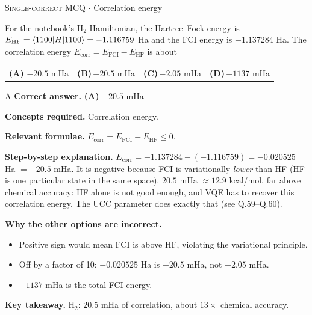 \documentclass[11pt,a4paper]{article}
\newcommand{\optlabel}[1]{\textbf{(#1)}}
\newcommand{\correctlabel}[1]{\textcolor{okgreen}{\textbf{(#1)}\,\ding{51}}}
\newenvironment{qitem}[1]{\begin{list}{}{\setlength{\leftmargin}{3.3em}\setlength{\labelwidth}{3.1em}%
  \setlength{\labelsep}{0.2em}\setlength{\topsep}{3pt}\setlength{\parsep}{3pt}}\item[\textbf{Q.#1}\hfill]}{\end{list}}
\newcommand{\qsep}{\par\vspace{2pt}{\color{black!15}\hrule}\vspace{4pt}}
\newcommand{\qmeta}[2]{{\footnotesize\color{black!60}\textsc{#1} \;$\cdot$\; #2}\par}
\begin{document}
\begin{qitem}{19}
\qmeta{Single-correct MCQ}{Correlation energy}
For the notebook's H$_2$ Hamiltonian, the Hartree--Fock energy is $E_{\mathrm{HF}} = \braket{1100|H|1100} = -1.116759$ Ha and the FCI energy is
$-1.137284$ Ha. The correlation energy $E_{\mathrm{corr}} = E_{\mathrm{FCI}} - E_{\mathrm{HF}}$ is about
\par\smallskip\noindent\begin{tabularx}{\linewidth}{@{}*{4}{L}@{}}
\correctlabel{A}\,$-20.5$ mHa & \optlabel{B}\,$+20.5$ mHa & \optlabel{C}\,$-2.05$ mHa & \optlabel{D}\,$-1137$ mHa
\end{tabularx}
\end{qitem}
\begin{solbox}{A}
\textbf{\color{brand}Correct answer.} \textcolor{okgreen}{\textbf{(A)}} $-20.5$ mHa

\textbf{\color{brand}Concepts required.} Correlation energy.

\textbf{\color{brand}Relevant formulae.} $E_{\mathrm{corr}} = E_{\mathrm{FCI}} - E_{\mathrm{HF}} \le 0$.

\textbf{\color{brand}Step-by-step explanation.} $E_{\mathrm{corr}} = -1.137284 - (-1.116759) = -0.020525$ Ha $= -20.5$ mHa. It is negative because FCI is variationally
\emph{lower} than HF (HF is one particular state in the same space). $20.5$ mHa $\approx 12.9$ kcal/mol, far above chemical accuracy:
HF alone is not good enough, and VQE has to recover this correlation energy. The UCC parameter does exactly that (see Q.59--Q.60).

\textbf{\color{brand}Why the other options are incorrect.}
\begin{itemize}[leftmargin=2.4em, itemsep=1pt, topsep=2pt]
\item[\textbf{(B)}] Positive sign would mean FCI is above HF, violating the variational principle.
\item[\textbf{(C)}] Off by a factor of 10: $-0.020525$ Ha is $-20.5$ mHa, not $-2.05$ mHa.
\item[\textbf{(D)}] $-1137$ mHa is the total FCI energy.
\end{itemize}
\textbf{\color{brand}Key takeaway.} H$_2$: $20.5$ mHa of correlation, about $13\times$ chemical accuracy.
\end{solbox}
\qsep
\end{document}
